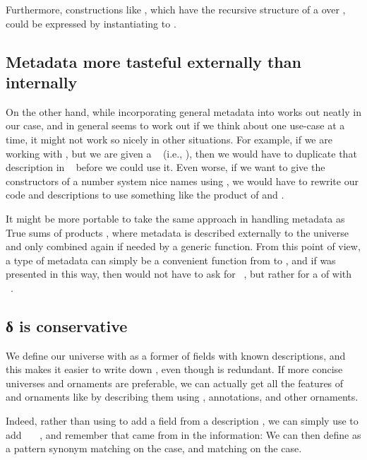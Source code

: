 Furthermore, constructions like , which have the recursive structure of a  over , could be expressed by instantiating  to .


\subsection{Metadata more tasteful externally than internally}
On the other hand, while incorporating general metadata into  works out neatly in our case, and in general seems to work out if we think about one use-case at a time, it might not work so nicely in other situations. For example, if we are working with , but we are given a \  (i.e., ), then we would have to duplicate that description in \  before we could use it. Even worse, if we want to give the constructors of a number system nice names using , we would have to rewrite our code and descriptions to use something like the product of  and . 

It might be more portable to take the same approach in handling metadata as True sums of products \cite{truesop}, where metadata is described externally to the universe and only combined again if needed by a generic function. From this point of view, a type of metadata can simply be a convenient function from  to , and if  was presented in this way, then  would not have to ask for \ , but rather for a  of  with \ .


\subsection{δ is conservative}\label{sec:redundant-delta}
We define our universe  with  as a former of fields with known descriptions, and this makes it easier to write down , even though  is redundant. If more concise universes and ornaments are preferable, we can actually get all the features of  and ornaments like  by describing them using , annotations, and other ornaments.

Indeed, rather than using  to add a field from a description , we can simply use  to add \ \AV{=}\ \ , and remember that  came from  in the information:
We can then define  as a pattern synonym matching on the  case, and  matching on the  case.

